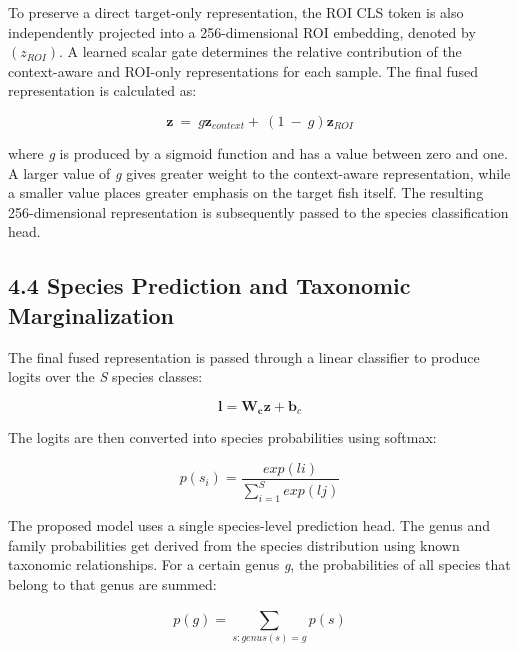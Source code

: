 \documentclass[preprint,12pt]{elsarticle}
\begin{document}
To preserve a direct target-only representation, the ROI CLS token is
also independently projected into a 256-dimensional ROI embedding,
denoted by \(\left( z_{ROI} \right)\). A learned scalar gate determines
the relative contribution of the context-aware and ROI-only
representations for each sample. The final fused representation is
calculated as:

\begin{equation}
\mathbf{z}\  = \ g\mathbf{z}_{context} + \ (1\  - \ g)\mathbf{z}_{ROI}
\end{equation}

where \emph{g} is produced by a sigmoid function and has a value between
zero and one. A larger value of \emph{g} gives greater weight to the
context-aware representation, while a smaller value places greater
emphasis on the target fish itself. The resulting 256-dimensional
representation is subsequently passed to the species classification
head.

\subsection*{4.4 Species Prediction and Taxonomic
Marginalization}\label{species-prediction-and-taxonomic-marginalization}

The final fused representation is passed through a linear classifier to
produce logits over the \emph{S} species classes:

\begin{equation}
\mathbf{l} = \mathbf{W}_{\mathbf{c}}\mathbf{z} + \mathbf{b}_{c}
\end{equation}

The logits are then converted into species probabilities using softmax:

\begin{equation}
p\left( s_{i} \right) = \frac{exp(li)}{\sum_{i = 1}^{S}{exp(lj)}}
\end{equation}

The proposed model uses a single species-level prediction head. The
genus and family probabilities get derived from the species distribution
using known taxonomic relationships. For a certain genus \emph{g}, the
probabilities of all species that belong to that genus are summed:

\begin{equation}
p(g) = \sum_{s:genus(s) = g}^{}{p(s)}
\end{equation}
\end{document}
